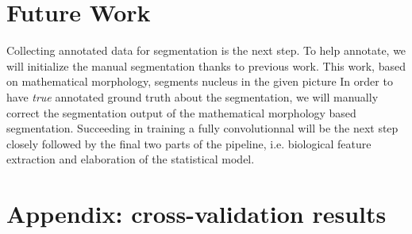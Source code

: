 \documentclass[a4paper,10pt]{article}
\begin{document}

\section{Future Work}

Collecting annotated data for segmentation is the next step. To help
annotate, we will initialize the manual segmentation thanks to
previous work. This work, based on mathematical morphology, segments
nucleus in the given picture In order to have \textit{true} annotated
ground truth about the segmentation, we will manually correct the
segmentation output of the mathematical morphology based
segmentation. Succeeding in training a fully convolutionnal will be
the next step closely followed by the final two parts of the pipeline,
i.e. biological feature extraction and elaboration of the statistical
model.  

\newpage
\section*{Appendix: cross-validation results}
\end{document}
